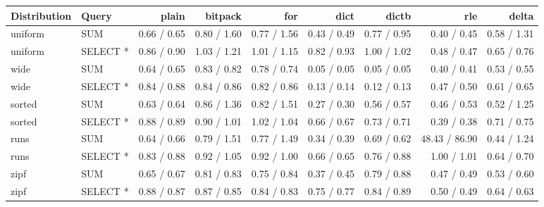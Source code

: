 \begin{tabular}{llrrrrrrr}
\toprule
Distribution & Query & plain & bitpack & for & dict & dictb & rle & delta \\
\midrule
uniform & SUM & 0.66 / 0.65 & 0.80 / 1.60 & 0.77 / 1.56 & 0.43 / 0.49 & 0.77 / 0.95 & 0.40 / 0.45 & 0.58 / 1.31 \\
uniform & SELECT * & 0.86 / 0.90 & 1.03 / 1.21 & 1.01 / 1.15 & 0.82 / 0.93 & 1.00 / 1.02 & 0.48 / 0.47 & 0.65 / 0.76 \\
wide & SUM & 0.64 / 0.65 & 0.83 / 0.82 & 0.78 / 0.74 & 0.05 / 0.05 & 0.05 / 0.05 & 0.40 / 0.41 & 0.53 / 0.55 \\
wide & SELECT * & 0.84 / 0.88 & 0.84 / 0.86 & 0.82 / 0.86 & 0.13 / 0.14 & 0.12 / 0.13 & 0.47 / 0.50 & 0.61 / 0.65 \\
sorted & SUM & 0.63 / 0.64 & 0.86 / 1.36 & 0.82 / 1.51 & 0.27 / 0.30 & 0.56 / 0.57 & 0.46 / 0.53 & 0.52 / 1.25 \\
sorted & SELECT * & 0.88 / 0.89 & 0.90 / 1.01 & 1.02 / 1.04 & 0.66 / 0.67 & 0.73 / 0.71 & 0.39 / 0.38 & 0.71 / 0.75 \\
runs & SUM & 0.64 / 0.66 & 0.79 / 1.51 & 0.77 / 1.49 & 0.34 / 0.39 & 0.69 / 0.62 & 48.43 / 86.90 & 0.44 / 1.24 \\
runs & SELECT * & 0.83 / 0.88 & 0.92 / 1.05 & 0.92 / 1.00 & 0.66 / 0.65 & 0.76 / 0.88 & 1.00 / 1.01 & 0.64 / 0.70 \\
zipf & SUM & 0.65 / 0.67 & 0.81 / 0.83 & 0.75 / 0.84 & 0.37 / 0.45 & 0.79 / 0.88 & 0.47 / 0.49 & 0.53 / 0.60 \\
zipf & SELECT * & 0.88 / 0.87 & 0.87 / 0.85 & 0.84 / 0.83 & 0.75 / 0.77 & 0.84 / 0.89 & 0.50 / 0.49 & 0.64 / 0.63 \\
\bottomrule
\end{tabular}
